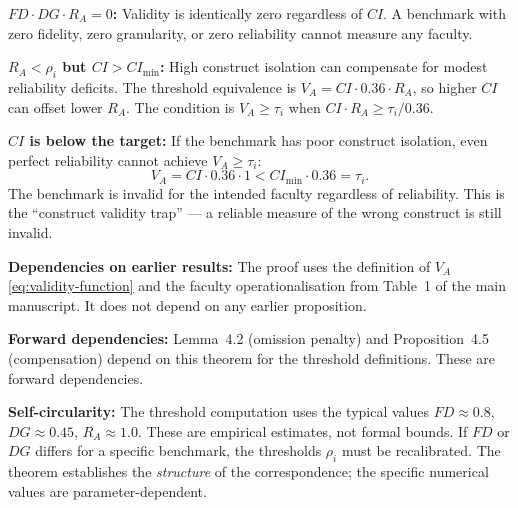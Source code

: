 \begin{boundary-case}
\textbf{$FD \cdot DG \cdot R_A = 0$:}
Validity is identically zero regardless of $CI$. A benchmark with
zero fidelity, zero granularity, or zero reliability cannot measure
any faculty.

\textbf{$R_A < \rho_i$ but $CI > CI_{\min}$:}
High construct isolation can compensate for modest reliability deficits.
The threshold equivalence is $V_A = CI \cdot 0.36 \cdot R_A$, so
higher $CI$ can offset lower $R_A$. The condition is
$V_A \geq \tau_i$ when $CI \cdot R_A \geq \tau_i / 0.36$.

\textbf{$CI$ is below the target:}
If the benchmark has poor construct isolation, even perfect reliability
cannot achieve $V_A \geq \tau_i$:
\[
V_A = CI \cdot 0.36 \cdot 1 < CI_{\min} \cdot 0.36 = \tau_i.
\]
The benchmark is invalid for the intended faculty regardless of
reliability. This is the ``construct validity trap'' — a reliable
measure of the wrong construct is still invalid.
\end{boundary-case}

\begin{circularity-check}
\textbf{Dependencies on earlier results:} The proof uses the
definition of $V_A$ \eqref{eq:validity-function} and the faculty
operationalisation from Table~1 of the main manuscript. It does
not depend on any earlier proposition.

\textbf{Forward dependencies:} Lemma~4.2 (omission penalty) and
Proposition~4.5 (compensation) depend on this theorem for the
threshold definitions. These are forward dependencies.

\textbf{Self-circularity:} The threshold computation uses the
typical values $FD \approx 0.8$, $DG \approx 0.45$, $R_A \approx 1.0$.
These are empirical estimates, not formal bounds. If $FD$ or $DG$
differs for a specific benchmark, the thresholds $\rho_i$ must be
recalibrated. The theorem establishes the \emph{structure} of the
correspondence; the specific numerical values are parameter-dependent.
\end{circularity-check}

